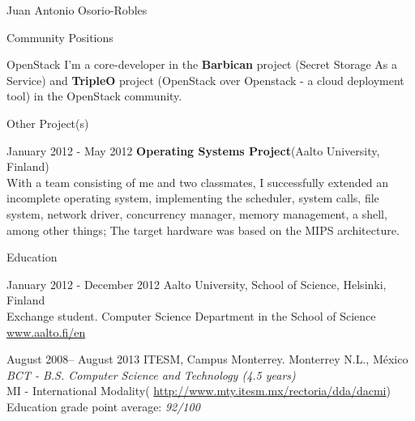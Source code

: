 \documentclass[english,10pt,letterpaper]{article}
\begin{document}
\begin{cv}{Juan Antonio Osorio-Robles}
    \begin{cvlist}{Community Positions}
		\item [OpenStack]
            I'm a core-developer in the \textbf{Barbican} project (Secret
            Storage As a Service) and \textbf{TripleO} project (OpenStack
            over Openstack - a cloud deployment tool) in the OpenStack
            community.
	\end{cvlist}

    \begin{cvlist}{Other Project(s)}
		\item [January 2012 - May 2012]
            \textbf{Operating Systems Project}(Aalto University, Finland)\\
            With a team consisting of me and two classmates, I successfully
            extended an incomplete operating system, implementing the scheduler,
            system calls, file system, network driver, concurrency manager,
            memory management, a shell, among other things; The target hardware
            was based on the MIPS architecture.
	\end{cvlist}

	\begin{cvlist}{Education}
		\item [January 2012 - December 2012]
			Aalto University, School of Science, Helsinki, Finland\\
			Exchange student. Computer Science Department in the School of
            Science\\
			\href{www.aalto.fi/en}{www.aalto.fi/en}

		\item	[August 2008-- August 2013]
			ITESM, Campus Monterrey. Monterrey N.L., M\'{e}xico\\
			\emph{BCT - B.S. Computer Science and Technology (4.5 years)}\\
			MI - International Modality(
            \href{http://www.mty.itesm.mx/rectoria/dda/dacmi}
            {http://www.mty.itesm.mx/rectoria/dda/dacmi})\\
			Education grade point average: \emph{92/100}
	\end{cvlist}


\end{cv}
\end{document}

